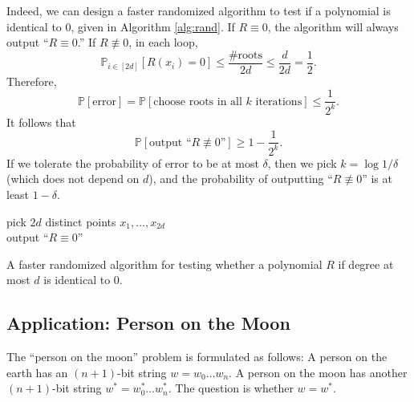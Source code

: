 \documentclass[letterpaper, reqno,11pt]{article}
\newcommand{\PP}{\mathbb{P}}
\begin{document}
Indeed, we can design a faster randomized algorithm to test if a polynomial is identical to $0$, given in Algorithm \ref{alg:rand}. If $R \equiv 0$, the algorithm will always output ``$R \equiv 0$.'' If $R \not \equiv 0$, in each loop,
$$ \PP_{i \in [2d]}\left[R\left(x_i\right) = 0\right] \leq \frac{\text{\# roots}}{2d} \leq \frac{d}{2d} = \frac{1}{2}. $$
Therefore,
$$ \PP[\text{error}] = \PP[\text{choose roots in all $k$ iterations}] \leq \frac{1}{2^k}. $$
It follows that
$$ \PP[\text{output ``$R \not \equiv 0$''}] \geq 1 - \frac{1}{2^k}. $$
If we tolerate the probability of error to be at most $\delta$, then we pick $k = \log 1/\delta$ (which does not depend on $d$), and the probability of outputting ``$R \not \equiv 0$'' is at least $1 - \delta$.

\begin{algorithm}
  pick $2d$ distinct points $x_1, \ldots, x_{2d}$ \\
  output ``$R \equiv 0$''
  \caption{A faster randomized algorithm for testing whether a polynomial $R$ if degree at most $d$ is identical to $0$.}
  \label{alg:rand}
\end{algorithm}

\subsection{Application: Person on the Moon}

The ``person on the moon'' problem is formulated as follows: A person on the earth has an $(n + 1)$-bit string $w = w_0 \ldots w_n$. A person on the moon has another $(n + 1)$-bit string $w^* = w_0^* \ldots w_n^*$. The question is whether $w = w^*$.
\end{document}
